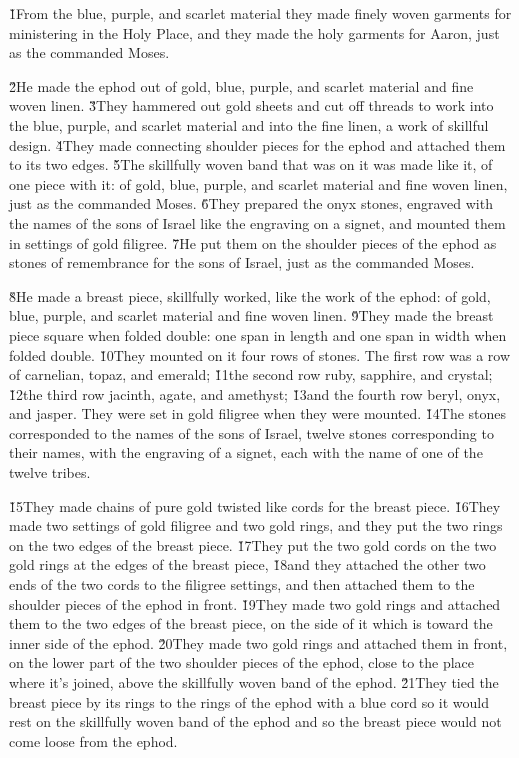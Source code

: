 \v{1}From the blue, purple, and scarlet material they made finely woven garments for ministering in the Holy Place, and they made the holy garments for Aaron, just as the  commanded Moses.

\v{2}He made the ephod out of gold, blue, purple, and scarlet material and fine woven linen. \v{3}They hammered out gold sheets and cut off threads to work into the blue, purple, and scarlet material and into the fine linen, a work of skillful design. \v{4}They made connecting shoulder pieces for the ephod and attached them to its two edges. \v{5}The skillfully woven band that was on it was made like it, of one piece with it: of gold, blue, purple, and scarlet material and fine woven linen, just as the  commanded Moses. \v{6}They prepared the onyx stones, engraved with the names of the sons of Israel like the engraving on a signet, and mounted them in settings of gold filigree. \v{7}He put them on the shoulder pieces of the ephod as stones of remembrance for the sons of Israel, just as the  commanded Moses.

\v{8}He made a breast piece, skillfully worked, like the work of the ephod: of gold, blue, purple, and scarlet material and fine woven linen. \v{9}They made the breast piece square when folded double: one span in length and one span in width when folded double. \v{10}They mounted on it four rows of stones. The first row was a row of carnelian, topaz, and emerald; \v{11}the second row ruby, sapphire, and crystal; \v{12}the third row jacinth, agate, and amethyst; \v{13}and the fourth row beryl, onyx, and jasper. They were set in gold filigree when they were mounted. \v{14}The stones corresponded to the names of the sons of Israel, twelve stones corresponding to their names, with the engraving of a signet, each with the name of one of the twelve tribes.

\v{15}They made chains of pure gold twisted like cords for the breast piece. \v{16}They made two settings of gold filigree and two gold rings, and they put the two rings on the two edges of the breast piece. \v{17}They put the two gold cords on the two gold rings at the edges of the breast piece, \v{18}and they attached the other two ends of the two cords to the filigree settings, and then attached them to the shoulder pieces of the ephod in front. \v{19}They made two gold rings and attached them to the two edges of the breast piece, on the side of it which is toward the inner side of the ephod. \v{20}They made two gold rings and attached them in front, on the lower part of the two shoulder pieces of the ephod, close to the place where it's joined, above the skillfully woven band of the ephod. \v{21}They tied the breast piece by its rings to the rings of the ephod with a blue cord so it would rest on the skillfully woven band of the ephod and so the breast piece would not come loose from the ephod.


